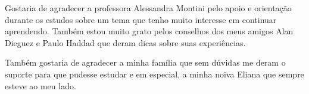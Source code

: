 \begin{agradecimentos}
Gostaria de agradecer a professora Alessandra Montini pelo apoio e orientação durante os estudos sobre um tema que tenho muito interesse em continuar aprendendo. Também estou muito grato pelos conselhos dos meus amigos Alan Dieguez e Paulo Haddad que deram dicas sobre suas experiências.

Também gostaria de agradecer a minha família que sem dúvidas me deram o suporte para que pudesse estudar e em especial, a minha noiva Eliana que sempre esteve ao meu lado.

\end{agradecimentos}
